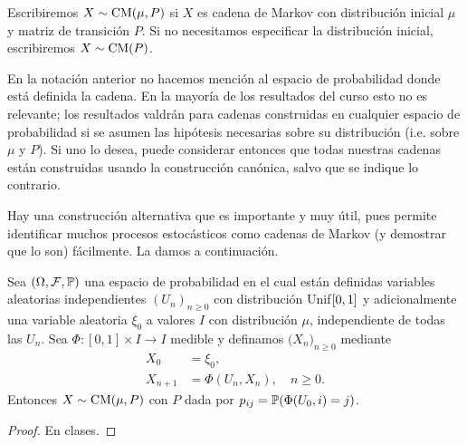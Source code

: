 \begin{notation}
Escribiremos $X\sim\text{\upshape{CM}}(\mu,P)$ si $X$ es cadena de Markov con distribución inicial $\mu$ y matriz de transición $P$.
Si no necesitamos especificar la distribución inicial, escribiremos $X\sim\text{\upshape{CM}}(P)$.
\end{notation}

En la notación anterior no hacemos mención al espacio de probabilidad donde está definida la cadena.
En la mayoría de los resultados del curso esto no es relevante; los resultados valdrán para cadenas construidas en cualquier espacio de probabilidad si se asumen las hipótesis necesarias sobre su distribución (i.e. sobre $\mu$ y $P$).
Si uno lo desea, puede considerar entonces que todas nuestras cadenas están construidas usando la construcción canónica, salvo que se indique lo contrario.

Hay una construcción alternativa que es importante y muy útil, pues permite identificar muchos procesos estocásticos como cadenas de Markov (y demostrar que lo son) fácilmente.
La damos a continuación.

\begin{thm}
Sea $(\Omega,\mathcal{F},\mathbb{P})$ una espacio de probabilidad en el cual están definidas variables aleatorias independientes $(U_n)_{n\geq0}$ con distribución Unif$\hspace{0.1em}[0,1]$ y adicionalmente una variable aleatoria $\xi_0$ a valores $I$ con distribución $\mu$, independiente de todas las $U_n$.
Sea $\Phi\!:\![0,1]\times I\longrightarrow I$ medible y definamos $\big(X_n\big)_{n\geq0}$ mediante
\begin{equation}
\begin{aligned}
X_0&=\xi_0,\\
X_{n+1}&=\Phi(U_n,X_n),\quad n\geq0.
\end{aligned}\label{eq:constrDirMarkov}
\end{equation}
Entonces $X\sim\text{\upshape{CM}}(\mu,P)$ con $P$ dada por $p_{ij}=\mathbb{P}(\Phi(U_0,i)=j)$.
\end{thm}

\begin{proof}
En clases. \ucmark
\end{proof}

